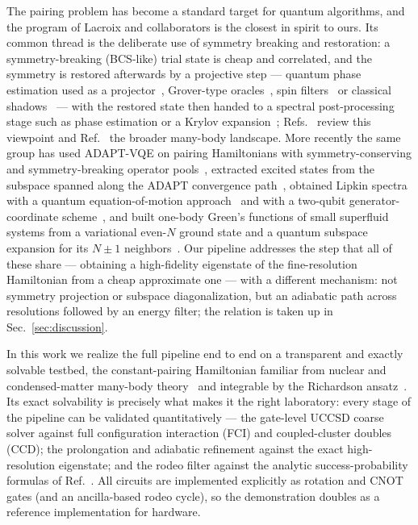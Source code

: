 \documentclass[
  aps,            %
  prc,            %
  reprint,        %
  superscriptaddress,
  floatfix,
  nofootinbib
]{revtex4-2}
\begin{document}
The pairing problem has become a standard target for quantum algorithms, and
the program of Lacroix and collaborators is the closest in spirit to ours.
Its common thread is the deliberate use of symmetry breaking and
restoration: a symmetry-breaking (BCS-like) trial state is cheap and
correlated, and the symmetry is restored afterwards by a projective step ---
quantum phase estimation used as a projector~\cite{Lacroix2020}, Grover-type
oracles~\cite{RuizGuzman2023}, spin filters~\cite{Siwach2021} or classical
shadows~\cite{RuizGuzman2024} --- with the restored state then handed to a
spectral post-processing stage such as phase estimation or a Krylov
expansion~\cite{RuizGuzman2022,RuizGuzman2021}; Refs.~\cite{Lacroix2023EPJA,Lacroix2023}
review this viewpoint and Ref.~\cite{Ayral2023} the broader many-body landscape.  More
recently the same group has used ADAPT-VQE on pairing Hamiltonians with
symmetry-conserving and symmetry-breaking operator pools~\cite{Zhang2024},
extracted excited states from the subspace spanned along the ADAPT convergence
path~\cite{Zhang2025}, obtained Lipkin spectra with a quantum
equation-of-motion approach~\cite{Hlatshwayo2022} and with a two-qubit
generator-coordinate scheme~\cite{BeaujeaultTaudiere2024}, and
built one-body Green's functions of small superfluid systems from a
variational even-$N$ ground state and a quantum subspace expansion for its
$N\pm1$ neighbors~\cite{AychetClaisse2026}.  Our pipeline addresses the step
that all of these share --- obtaining a high-fidelity eigenstate of the
fine-resolution Hamiltonian from a cheap approximate one --- with a different
mechanism: not symmetry projection or subspace diagonalization, but an
adiabatic path across resolutions followed by an energy filter; the relation
is taken up in Sec.~\ref{sec:discussion}.

In this work we realize the full pipeline end to end on a transparent and exactly
solvable testbed, the constant-pairing Hamiltonian familiar from nuclear and
condensed-matter many-body theory~\cite{LNP936} and integrable by the Richardson
ansatz~\cite{Richardson1963,RichardsonSherman1964,Dukelsky2004}.  Its exact
solvability is precisely what makes it the right laboratory: every stage of the
pipeline can be validated quantitatively --- the gate-level UCCSD coarse solver
against full configuration interaction (FCI) and coupled-cluster doubles (CCD); the
prolongation and adiabatic refinement against the exact high-resolution eigenstate;
and the rodeo filter against the analytic success-probability formulas of
Ref.~\cite{Qian2024}.  All circuits are implemented explicitly as rotation and CNOT
gates (and an ancilla-based rodeo cycle), so the demonstration doubles as a
reference implementation for hardware.
\end{document}
